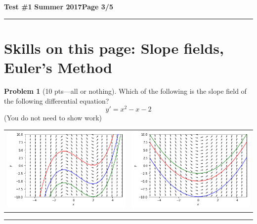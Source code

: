 \documentclass[12pt]{article}
\theoremstyle{definition}
\newtheorem{problem}{Problem}
\begin{document}
\hfill{\large\bf Test \#1}\hfill{\large\bf
Summer 2017}\hfill{\large\bf Page 3/5}\hrule

\section*{Skills on this page: Slope fields, Euler's Method}
\begin{problem}[10 pts---all or nothing]
Which of the following is the slope field of the following differential equation?
\begin{equation*}
y' = x^2 -x-2
\end{equation*}
\noindent (You do not need to show work)
\begin{center}
\begin{tabular}{cc}
\includegraphics[width=0.5\linewidth]{quiver1.png} &
\includegraphics[width=0.5\linewidth]{quiver2.png}
\end{tabular}
\end{center}
\end{problem}
\hrule
\end{document}
